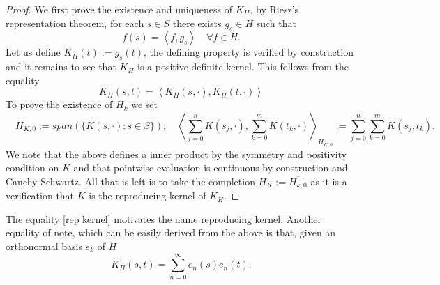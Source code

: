 \documentclass[12pt]{article}
\newcommand{\br}[1]{\left\langle#1\right\rangle}
\begin{document}
\begin{proof}
    We first prove the existence and uniqueness of $K_H$, by Riesz's representation theorem, for each $s\in S$ there exists $g_s\in H$ such that
    \begin{equation*}
        f(s)=\br{f,g_s}\quad\forall f\in H.
    \end{equation*}
    Let us define $K_H(t):=g_s(t)$, the defining property is verified by construction and it remains to see that $K_H$ is a positive definite
    kernel. This follows from the equality
    \begin{equation}\label{rep kernel}
        K_H(s,t)=\br{K_H(s,\cdot ),K_H(t,\cdot )}
    \end{equation}
    To prove the existence of $H_k$ we set
    \begin{equation*}
        \quad H_{K,0}:=span(\{K(s,\cdot ):s\in S\});\quad \br{\sum_{j=0}^{n}K(s_j,\cdot ),\sum_{k=0}^{m} K(t_k,\cdot )}_{H_{K,0}}:=\sum_{j=0}^{n}\sum_{k=0}^{m}K(s_j,t_k).
    \end{equation*}
    We note that the above defines a inner product by the symmetry and positivity condition on $K$ and that pointwise evaluation is continuous by construction and Cauchy Schwartz. All that is left is to take the completion  $H_K:=\overline{H_{k,0}}$ as it is a verification that $K$ is the reproducing kernel of  $K_H$.
\end{proof}
The equality \eqref{rep kernel} motivates the name reproducing kernel. Another equality of note, which can be easily derived from the above is that, given an orthonormal basis $e_k$ of $H$
\begin{equation*}
    K_H(s,t)=\sum_{n=0}^{\infty} e_n(s)\overline{e_n(t)}.
\end{equation*}
\end{document}
